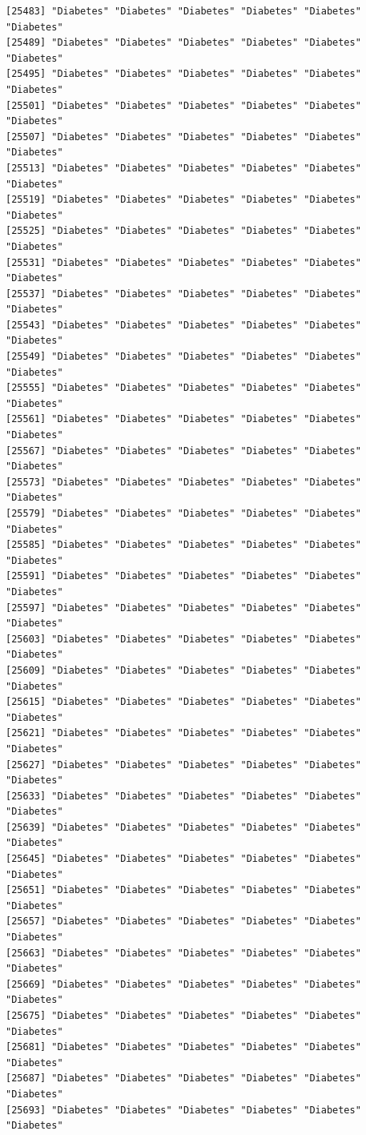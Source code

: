 \documentclass[
  letterpaper,
  DIV=11,
  numbers=noendperiod]{scrartcl}
\begin{document}
\begin{verbatim}
[25483] "Diabetes" "Diabetes" "Diabetes" "Diabetes" "Diabetes" "Diabetes"
[25489] "Diabetes" "Diabetes" "Diabetes" "Diabetes" "Diabetes" "Diabetes"
[25495] "Diabetes" "Diabetes" "Diabetes" "Diabetes" "Diabetes" "Diabetes"
[25501] "Diabetes" "Diabetes" "Diabetes" "Diabetes" "Diabetes" "Diabetes"
[25507] "Diabetes" "Diabetes" "Diabetes" "Diabetes" "Diabetes" "Diabetes"
[25513] "Diabetes" "Diabetes" "Diabetes" "Diabetes" "Diabetes" "Diabetes"
[25519] "Diabetes" "Diabetes" "Diabetes" "Diabetes" "Diabetes" "Diabetes"
[25525] "Diabetes" "Diabetes" "Diabetes" "Diabetes" "Diabetes" "Diabetes"
[25531] "Diabetes" "Diabetes" "Diabetes" "Diabetes" "Diabetes" "Diabetes"
[25537] "Diabetes" "Diabetes" "Diabetes" "Diabetes" "Diabetes" "Diabetes"
[25543] "Diabetes" "Diabetes" "Diabetes" "Diabetes" "Diabetes" "Diabetes"
[25549] "Diabetes" "Diabetes" "Diabetes" "Diabetes" "Diabetes" "Diabetes"
[25555] "Diabetes" "Diabetes" "Diabetes" "Diabetes" "Diabetes" "Diabetes"
[25561] "Diabetes" "Diabetes" "Diabetes" "Diabetes" "Diabetes" "Diabetes"
[25567] "Diabetes" "Diabetes" "Diabetes" "Diabetes" "Diabetes" "Diabetes"
[25573] "Diabetes" "Diabetes" "Diabetes" "Diabetes" "Diabetes" "Diabetes"
[25579] "Diabetes" "Diabetes" "Diabetes" "Diabetes" "Diabetes" "Diabetes"
[25585] "Diabetes" "Diabetes" "Diabetes" "Diabetes" "Diabetes" "Diabetes"
[25591] "Diabetes" "Diabetes" "Diabetes" "Diabetes" "Diabetes" "Diabetes"
[25597] "Diabetes" "Diabetes" "Diabetes" "Diabetes" "Diabetes" "Diabetes"
[25603] "Diabetes" "Diabetes" "Diabetes" "Diabetes" "Diabetes" "Diabetes"
[25609] "Diabetes" "Diabetes" "Diabetes" "Diabetes" "Diabetes" "Diabetes"
[25615] "Diabetes" "Diabetes" "Diabetes" "Diabetes" "Diabetes" "Diabetes"
[25621] "Diabetes" "Diabetes" "Diabetes" "Diabetes" "Diabetes" "Diabetes"
[25627] "Diabetes" "Diabetes" "Diabetes" "Diabetes" "Diabetes" "Diabetes"
[25633] "Diabetes" "Diabetes" "Diabetes" "Diabetes" "Diabetes" "Diabetes"
[25639] "Diabetes" "Diabetes" "Diabetes" "Diabetes" "Diabetes" "Diabetes"
[25645] "Diabetes" "Diabetes" "Diabetes" "Diabetes" "Diabetes" "Diabetes"
[25651] "Diabetes" "Diabetes" "Diabetes" "Diabetes" "Diabetes" "Diabetes"
[25657] "Diabetes" "Diabetes" "Diabetes" "Diabetes" "Diabetes" "Diabetes"
[25663] "Diabetes" "Diabetes" "Diabetes" "Diabetes" "Diabetes" "Diabetes"
[25669] "Diabetes" "Diabetes" "Diabetes" "Diabetes" "Diabetes" "Diabetes"
[25675] "Diabetes" "Diabetes" "Diabetes" "Diabetes" "Diabetes" "Diabetes"
[25681] "Diabetes" "Diabetes" "Diabetes" "Diabetes" "Diabetes" "Diabetes"
[25687] "Diabetes" "Diabetes" "Diabetes" "Diabetes" "Diabetes" "Diabetes"
[25693] "Diabetes" "Diabetes" "Diabetes" "Diabetes" "Diabetes" "Diabetes"

\end{verbatim}
\end{document}
